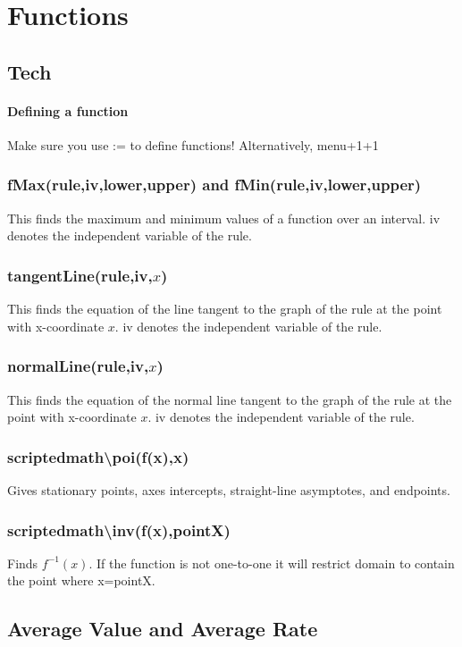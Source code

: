 \documentclass[a4paper,twoside,10pt]{article}
\begin{document}
	\section{Functions}
		\subsection{Tech}
			\paragraph{Defining a function} Make sure you use := to define functions! Alternatively, menu+1+1
			
			\subsubsection{fMax(rule,iv,lower,upper) and fMin(rule,iv,lower,upper)}
			This finds the maximum and minimum values of a function over an interval. iv denotes the independent variable of the rule.
			
			\subsubsection{tangentLine(rule,iv,$x$)}
			This finds the equation of the line tangent to the graph of the rule at the point with x-coordinate $x$. iv denotes the independent variable of the rule.
			
			\subsubsection{normalLine(rule,iv,$x$)}
			This finds the equation of the normal line tangent to the graph of the rule at the point with x-coordinate $x$. iv denotes the independent variable of the rule.
			
			\subsubsection{scriptedmath\textbackslash poi(f(x),x)} Gives stationary points, axes intercepts, straight-line asymptotes, and endpoints.
			\subsubsection{scriptedmath\textbackslash inv(f(x),pointX)} Finds $f^{-1}(x)$. If the function is not one-to-one it will restrict domain to contain the point where x=pointX.
		\subsection{Average Value and Average Rate}
\end{document}
